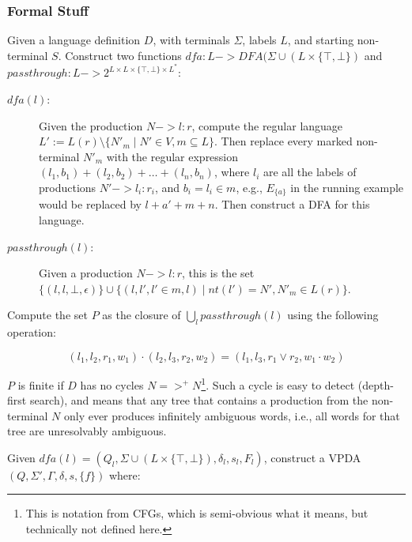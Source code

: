 \documentclass[acmsmall,review,anonymous]{acmart}\settopmatter{printfolios=true,printccs=false,printacmref=false}
\newcommand{\NT}{V} %
\newcommand{\T}{\Sigma} %
\newcommand{\Labels}{L} %
\newcommand{\dfa}{\mathit{dfa}} %
\newcommand{\passthrough}{\mathit{passthrough}} %
\newcommand{\nt}{\mathit{nt}} %
\begin{document}
\subsubsection{Formal Stuff}

Given a language definition $D$, with terminals $\T$, labels $\Labels$, and starting non-terminal $S$. Construct two functions $\dfa : \Labels -> \mathit{DFA}(\T \cup (\Labels \times \{\top, \bot\})$ and $\passthrough : \Labels -> 2^{\Labels \times \Labels \times \{\top, \bot\} \times \Labels^{*}}$:

\begin{description}
\item[$\dfa(l)$:] Given the production $N -> l : r$, compute the regular language $L' := L(r) \setminus \{N'_m \mid N' \in \NT, m \subseteq \Labels\}$. Then replace every marked non-terminal $N'_m$ with the regular expression $(l_1, b_1) + (l_2, b_2) + \ldots + (l_n, b_n)$, where $l_i$ are all the labels of productions $N' -> l_i : r_i$, and $b_i = l_i \in m$, e.g., $E_{\{a\}}$ in the running example would be replaced by $l + a' + m + n$. Then construct a DFA for this language.

\item[$\passthrough(l)$:] Given a production $N -> l : r$, this is the set $\{(l, l, \bot, \epsilon)\} \cup \{(l, l', l' \in m, l) \mid \nt(l') = N', N'_m \in L(r)\}$.
\end{description}

\noindent Compute the set $P$ as the closure of $\bigcup_l \passthrough(l)$ using the following operation:

$$ (l_1, l_2, r_1, w_1) \cdot (l_2, l_3, r_2, w_2) = (l_1, l_3, r_1 \lor r_2, w_1 \cdot w_2) $$

\noindent $P$ is finite if $D$ has no cycles $N =>^{+} N$\footnote{This is notation from CFGs, which is semi-obvious what it means, but technically not defined here.}. Such a cycle is easy to detect (depth-first search), and means that any tree that contains a production from the non-terminal $N$ only ever produces infinitely ambiguous words, i.e., all words for that tree are unresolvably ambiguous.

Given $\dfa(l) = (Q_l, \T \cup (\Labels \times \{\top, \bot\}), \delta_l, s_l, F_l)$, construct a VPDA $(Q, \T', \Gamma, \delta, s, \{f\})$ where:

\end{document}
